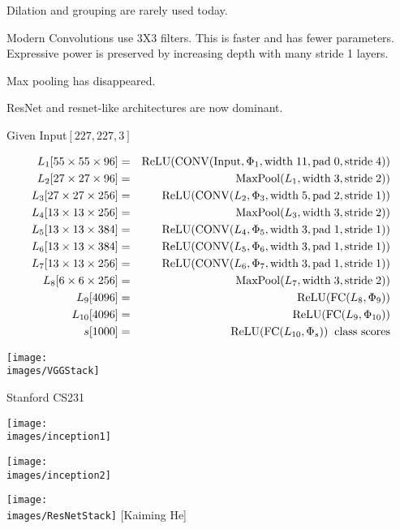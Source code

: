 {\vfill
Dilation and grouping are rarely used today.


Modern Convolutions use 3X3 filters.  This is faster and has fewer parameters.  Expressive power is preserved by increasing depth with many stride 1 layers.

\vfill
Max pooling has disappeared.

\vfill
ResNet and resnet-like architectures are now dominant.

{\huge
\centerline{Given Input$[227,227,3]$}

\begin{eqnarray*}
L_1[55 \times 55 \times 96] & = & \mathrm{ReLU}(\mathrm{CONV}(\mathrm{Input},\Phi_1,\mathrm{width}\;11,\mathrm{pad}\;0,\mathrm{stride}\;4)) \\
L_2[27 \times 27 \times 96] & = & \mathrm{MaxPool}(L_1,\mathrm{width}\;3,\mathrm{stride}\;2))  \\
L_3[27 \times 27 \times 256] & = & \mathrm{ReLU}(\mathrm{CONV}(L_2,\Phi_3,\mathrm{width}\;5,\mathrm{pad}\;2,\mathrm{stride}\;1))  \\
L_4[13 \times 13 \times 256] & = & \mathrm{MaxPool}(L_3,\mathrm{width}\;3,\mathrm{stride}\;2))  \\
L_5[13 \times 13 \times 384] & = & \mathrm{ReLU}(\mathrm{CONV}(L_4,\Phi_5,\mathrm{width}\;3,\mathrm{pad}\;1,\mathrm{stride}\;1))  \\
L_6[13 \times 13 \times 384] & = & \mathrm{ReLU}(\mathrm{CONV}(L_5,\Phi_6,\mathrm{width}\;3,\mathrm{pad}\;1,\mathrm{stride}\;1))  \\
L_7[13 \times 13 \times 256] & = & \mathrm{ReLU}(\mathrm{CONV}(L_6,\Phi_7,\mathrm{width}\;3,\mathrm{pad}\;1,\mathrm{stride}\;1))  \\
L_8[6 \times 6 \times 256] & = & \mathrm{MaxPool}(L_7,\mathrm{width}\;3,\mathrm{stride}\;2)) \\
L_9[4096] & = & \mathrm{ReLU}(\mathrm{FC}(L_8,\Phi_9)) \\
L_{10}[4096] & = & \mathrm{ReLU}(\mathrm{FC}(L_9,\Phi_{10})) \\
s[1000] & = & \mathrm{ReLU}(\mathrm{FC}(L_{10},\Phi_s)) \;\;\mbox{class scores}
\end{eqnarray*}
}

\centerline{\texttt{[image: \\images/VGGStack]}}
\centerline{\large Stanford CS231}


\centerline{\texttt{[image: \\images/inception1]}}
\vfill
\centerline{\texttt{[image: \\images/inception2]}}

\centerline{\texttt{[image: \\images/ResNetStack]} {\large [Kaiming He]}}

}
